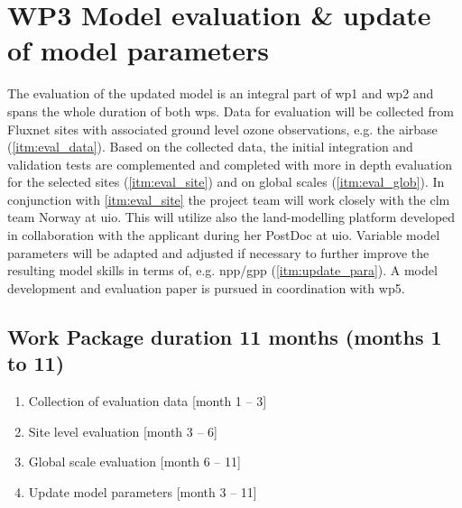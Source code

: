 \section{WP3 Model evaluation \& update of model parameters}
\label{sec:wp3}
The evaluation of the updated model is an integral part of \gls{wp}1 and \gls{wp}2 and spans the whole duration of both \glspl{wp}. Data for evaluation will be collected from Fluxnet sites with associated ground level ozone observations, e.g. the \gls{airbase} (\ref{itm:eval_data}). Based on the collected data, the initial integration and validation tests are complemented and completed with more in depth evaluation for the selected sites (\ref{itm:eval_site}) and on global scales (\ref{itm:eval_glob}). In conjunction with \ref{itm:eval_site} the project team will work closely with the \gls{clm} team Norway at \gls{uio}. This will utilize also the land-modelling platform developed in collaboration with the applicant during her PostDoc at \gls{uio}. Variable model parameters will be adapted and adjusted if necessary to further improve the resulting model skills in terms of, e.g. \gls{npp}/\gls{gpp} (\ref{itm:update_para}). A model development and evaluation paper is pursued in coordination with \gls{wp}5.
{
\subsection*{Work Package duration 11 months (months 1 to 11)}
\begin{enumerate}[start=1,label={T3.\arabic*}]
  \itemsep0pt
\item Collection of evaluation data \hfill [month 1 -- 3]\label{itm:eval_data}
\item Site level evaluation \hfill [month 3 -- 6]\label{itm:eval_site}
\item Global scale evaluation \hfill [month 6 -- 11]\label{itm:eval_glob}
\item Update model parameters \hfill [month 3 -- 11]\label{itm:update_para}
\end{enumerate}
}

\vspace{0.5\baselineskip}
